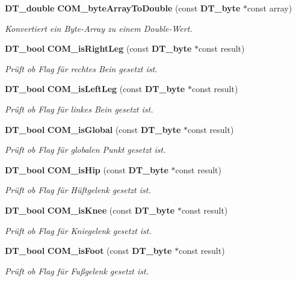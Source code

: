 \begin{DoxyCompactItemize}
{\bf DT\_\-double} {\bf COM\_\-byteArrayToDouble} (const {\bf DT\_\-byte} $\ast$const array)
\begin{DoxyCompactList}\small\item\em Konvertiert ein Byte-\/Array zu einem Double-\/Wert. \item\end{DoxyCompactList}\item 
{\bf DT\_\-bool} {\bf COM\_\-isRightLeg} (const {\bf DT\_\-byte} $\ast$const result)
\begin{DoxyCompactList}\small\item\em Prüft ob Flag für rechtes Bein gesetzt ist. \item\end{DoxyCompactList}\item 
{\bf DT\_\-bool} {\bf COM\_\-isLeftLeg} (const {\bf DT\_\-byte} $\ast$const result)
\begin{DoxyCompactList}\small\item\em Prüft ob Flag für linkes Bein gesetzt ist. \item\end{DoxyCompactList}\item 
{\bf DT\_\-bool} {\bf COM\_\-isGlobal} (const {\bf DT\_\-byte} $\ast$const result)
\begin{DoxyCompactList}\small\item\em Prüft ob Flag für globalen Punkt gesetzt ist. \item\end{DoxyCompactList}\item 
{\bf DT\_\-bool} {\bf COM\_\-isHip} (const {\bf DT\_\-byte} $\ast$const result)
\begin{DoxyCompactList}\small\item\em Prüft ob Flag für Hüftgelenk gesetzt ist. \item\end{DoxyCompactList}\item 
{\bf DT\_\-bool} {\bf COM\_\-isKnee} (const {\bf DT\_\-byte} $\ast$const result)
\begin{DoxyCompactList}\small\item\em Prüft ob Flag für Kniegelenk gesetzt ist. \item\end{DoxyCompactList}\item 
{\bf DT\_\-bool} {\bf COM\_\-isFoot} (const {\bf DT\_\-byte} $\ast$const result)
\begin{DoxyCompactList}\small\item\em Prüft ob Flag für Fußgelenk gesetzt ist. \item\end{DoxyCompactList}\item 

\end{DoxyCompactItemize}
